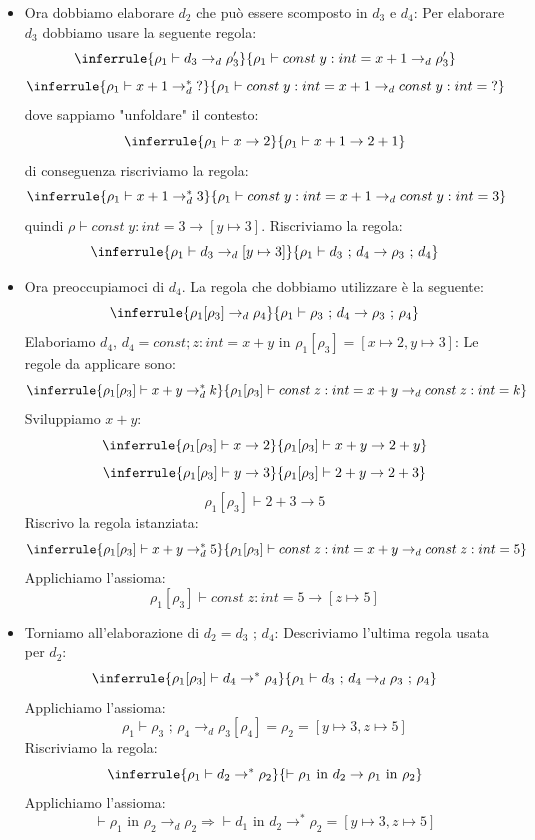 \documentclass[a4paper]{article}
\begin{document}
\begin{Example}{}{}
\begin{itemize}
  Regola ora da applicare:
  \[
    \inferrule
      {\rho_1 \vdash d_2 \to d_2'}
      {\vdash \rho_1 \text{ in } d_2 \to \rho_1 \text{ in } d_2'}
    \quad \equiv \quad
    \inferrule
      {\rho_1 \vdash d_2 \to_d^* \rho_2}
      {\vdash \rho_1 \text{ in } d_2 \to \rho_1 \text{ in } \rho_2}
  \]
  \item Ora dobbiamo elaborare $d_2$ che può essere scomposto in $d_3$ e $d_4$:
  Per elaborare $d_3$ dobbiamo usare la seguente regola:
  \[
    \inferrule
      {\rho_1 \vdash d_3 \to_d \rho_3'}
      {\rho_1 \vdash const \; y : int = x + 1 \to_d \rho_3'}
  \]
  \[
    \inferrule
      {\rho_1 \vdash x+1 \to_d^* \text{?}}
      {\rho_1 \vdash const \; y : int = x + 1 \to_d const \; y : int = \text{?}}
  \]
  dove sappiamo "unfoldare" il contesto:
  \[
    \inferrule
      {\rho_1 \vdash x \to 2}
      {\rho_1 \vdash x + 1 \to 2 + 1}
  \]
  di conseguenza riscriviamo la regola:
  \[
    \inferrule
      {\rho_1 \vdash x + 1 \to_d^* 3}
      {\rho_1 \vdash const \; y : int = x + 1 \to_d const \; y : int = 3}
  \]
  quindi $\rho \vdash const \; y : int = 3 \to [y \mapsto 3]$.
  Riscriviamo la regola:
  \[
    \inferrule
      {\rho_1 \vdash d_3 \to_d [y \mapsto 3]}
      {\rho_1 \vdash d_3 \text{ ; } d_4 \to \rho_3 \text{ ; } d_4}
  \]
  \item Ora preoccupiamoci di $d_4$. La regola che dobbiamo utilizzare è la seguente:
  \[
    \inferrule
      {\rho_1[\rho_3] \to_d \rho_4}
      {\rho_1 \vdash \rho_3 \text{ ; } d_4 \to \rho_3 \text{ ; } \rho_4}
  \]
  Elaboriamo $d_4$, $d_4 = const ; z : int = x + y$ in $\rho_1[\rho_3] = [x \mapsto 2, y \mapsto 3]$:
  Le regole da applicare sono:
  \[
    \inferrule
      {\rho_1[\rho_3] \vdash x + y \to_d^* k}
      {\rho_1[\rho_3] \vdash const \; z : int = x + y \to_d const \; z : int = k}
  \]
  Sviluppiamo $x + y$:
  \[
    \inferrule
      {\rho_1[\rho_3] \vdash x \to 2}
      {\rho_1[\rho_3] \vdash x + y \to 2 + y}
  \]
  \[
    \inferrule
      {\rho_1[\rho_3] \vdash y \to 3}
      {\rho_1[\rho_3] \vdash 2 + y \to 2 + 3}
  \]
  \[
    \rho_1[\rho_3] \vdash 2 + 3 \to 5
  \]
  Riscrivo la regola istanziata:
  \[
    \inferrule
      {\rho_1[\rho_3] \vdash x + y \to_d^* 5}
      {\rho_1[\rho_3] \vdash const \; z : int = x + y \to_d const \; z : int = 5}
  \]
  Applichiamo l'assioma:
  \[
    \rho_1[\rho_3] \vdash const \; z : int = 5 \to [z \mapsto 5]
  \]
  \item Torniamo all'elaborazione di $d_2 = d_3 \text{ ; } d_4$:
  Descriviamo l'ultima regola usata per $d_2$:
  \[
    \inferrule
      {\rho_1[\rho_3] \vdash d_4 \to^* \rho_4}
      {\rho_1 \vdash d_3 \text{ ; } d_4 \to_d \rho_3 \text{ ; } \rho_4}
  \]
  Applichiamo l'assioma:
  \[
    \rho_1 \vdash \rho_3 \text{ ; } \rho_4 \to_d \rho_3[\rho_4] = \rho_2 = [y \mapsto 3, z \mapsto 5]
  \]
  Riscriviamo la regola:
  \[
    \inferrule 
      {\rho_1 \vdash d_2 \to^* \rho_2}
      {\vdash \rho_1 \text{ in } d_2 \to \rho_1 \text{ in } \rho_2 }
  \]
  Applichiamo l'assioma:
  \[
    \vdash \rho_1 \text{ in } \rho_2 \to_d \rho_2 \Rightarrow \vdash d_1 \text{ in } d_2 \to^* \rho_2 = [y \mapsto 3, z \mapsto 5]
  \]
\end{itemize}

\end{Example}
\end{document}
